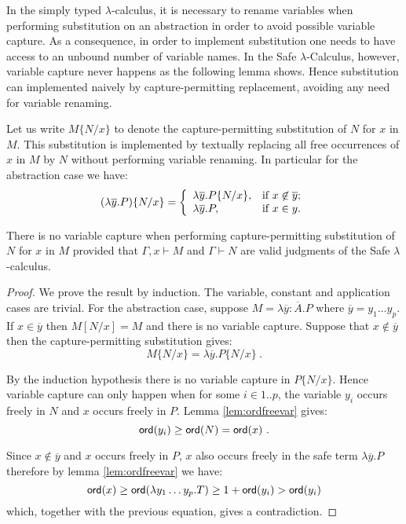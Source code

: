 \documentclass{llncs}
\newcommand\subst[2]{\left[ #1/#2 \right]}
\newcommand\captsubst[2]{\{#1/#2 \}}
\newcommand\ord[1]{{\sf ord}(#1)}
\begin{document}
In the simply typed $\lambda$-calculus, it is necessary to rename
variables when performing substitution on an abstraction in order to
avoid possible variable capture. As a consequence, in order to
implement substitution one needs to have access to an unbound number
of variable names.
In the Safe $\lambda$-Calculus, however, variable capture never happens as the following lemma shows.
Hence substitution can implemented naively by capture-permitting replacement, avoiding any need for variable renaming.


Let us write $M\captsubst{N}{x}$ to denote the capture-permitting substitution of $N$ for $x$ in $M$. This substitution is implemented
by textually replacing all free occurrences of $x$ in $M$ by $N$ without performing variable renaming.
In particular for the abstraction case we have:
$$(\lambda \overline{y} . P)\captsubst{N}{x} = \left\{
                                                 \begin{array}{ll}
                                                   \lambda \overline{y} . P\captsubst{N}{x} , & \hbox{if $x\not\in \overline{y}$;} \\
                                                   \lambda \overline{y} . P, & \hbox{if $x\in y$.}
                                                 \end{array}
                                               \right.
$$

\begin{lemma}
\label{lem:homog_nocapture} There is
no variable capture when performing capture-permitting
substitution of $N$ for $x$ in $M$
provided that $\Gamma, x \vdash M$ and $\Gamma \vdash  N$ are valid judgments of the Safe $\lambda$-calculus.
\end{lemma}

\begin{proof}
We prove the result by induction. The variable, constant and
application cases are trivial. For the abstraction case, suppose $M
= \lambda \overline{y} : \overline{A}. P$ where $\overline{y} = y_1
\ldots y_p$. If $x \in \overline{y}$ then $M \subst{N}{x} = M$ and there is no variable capture.
Suppose that $x \not\in \overline{y}$ then the capture-permitting substitution gives:
$$M \captsubst{N}{x} = \lambda \overline{y} . P \captsubst{N}{x} \ .$$


By the induction hypothesis there is no variable capture in $P \captsubst{N}{x}$.
Hence variable capture can only happen when for some $i \in 1..p$, the variable $y_i$
occurs freely in $N$ and $x$ occurs freely in $P$. Lemma \ref{lem:ordfreevar} gives:
$$ \ord{y_i} \geq \ord{N} = \ord{x} \ .$$

Since $x \not \in \overline{y}$ and $x$ occurs freely in $P$, $x$ also occurs freely in the safe term
$\lambda \overline{y}. P$ therefore by lemma \ref{lem:ordfreevar} we have:
$$ \ord{x} \geq \ord{\lambda y_1 \ldots y_p . T} \geq 1+ \ord{y_i} > \ord{y_i}$$
which, together with the previous equation, gives a contradiction.
\end{proof}
\end{document}
